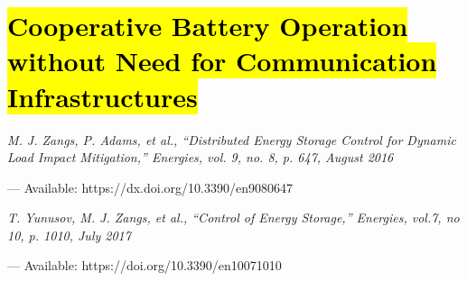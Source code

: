\chapter{\hl{Cooperative Battery Operation without Need for Communication Infrastructures}}
\label{ch4}

\singlespacing
\epigraph{\textit{M. J. Zangs, P. Adams, et al., ``Distributed Energy Storage Control for Dynamic Load Impact Mitigation,'' Energies, vol. 9, no. 8, p. 647, August 2016}}{--- Available: https://dx.doi.org/10.3390/en9080647}
\epigraph{\textit{T. Yunusov, M. J. Zangs, et al., ``Control of Energy Storage,'' Energies, vol.7, no 10, p. 1010, July 2017}}{--- Available: https://doi.org/10.3390/en10071010}
\doublespacing













